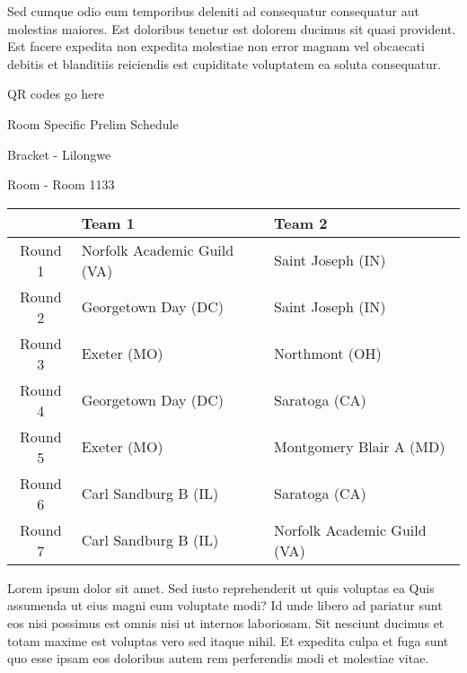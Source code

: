 \documentclass{article}%
\begin{document}
\newline%
Sed cumque odio eum temporibus deleniti ad consequatur consequatur aut molestias maiores. Est doloribus tenetur est dolorem ducimus sit quasi provident. Est facere expedita non expedita molestiae non error magnam vel obcaecati debitis et blanditiis reiciendis est cupiditate voluptatem ea soluta consequatur.%
\vspace*{140pt}%
\begin{center}%
\begin{Huge}%
QR codes go here%
\end{Huge}%
\end{center}%
\newpage%
\begin{center}%
\begin{Huge}%
Room Specific Prelim Schedule%
\end{Huge}%
\vspace*{8pt}%
\linebreak%
\begin{Large}%
Bracket {-} Lilongwe%
\end{Large}%
\vspace*{8pt}%
\linebreak%
\vspace*{8pt}%
\begin{Large}%
Room {-} Room 1133%
\end{Large}%
\end{center}%
%
\begin{tabularx}{\textwidth}{|c|Y|Y|}%
\hline%
&Team 1&Team 2\\%
\hline%
Round 1&Norfolk Academic Guild (VA)&Saint Joseph (IN)\\%
Round 2&Georgetown Day (DC)&Saint Joseph (IN)\\%
Round 3&Exeter (MO)&Northmont (OH)\\%
Round 4&Georgetown Day (DC)&Saratoga (CA)\\%
Round 5&Exeter (MO)&Montgomery Blair A (MD)\\%
Round 6&Carl Sandburg B (IL)&Saratoga (CA)\\%
Round 7&Carl Sandburg B (IL)&Norfolk Academic Guild (VA)\\%
\hline%
\end{tabularx}%
\vspace*{8pt}%
\newline%
Lorem ipsum dolor sit amet. Sed iusto reprehenderit ut quis voluptas ea Quis assumenda ut eius magni eum voluptate modi? Id unde libero ad pariatur sunt eos nisi possimus est omnis nisi ut internos laboriosam. Sit nesciunt ducimus et totam maxime est voluptas vero sed itaque nihil. Et expedita culpa et fuga sunt quo esse ipsam eos doloribus autem rem perferendis modi et molestiae vitae.\newline%
\end{document}
